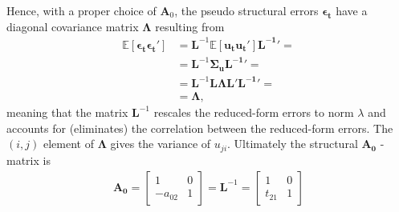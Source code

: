 \documentclass[a4paper,11pt,listof=nochaptergap,oneside,pointednumbers,bibtotoc,bigheadings,liststotoc]{scrbook}
\theoremstyle{mysatz}
\theoremstyle{mydefinition}
\theoremstyle{mytheorem}
\theoremstyle{mybemerkung}
\newcommand{\vect}[1]{\boldsymbol{\mathbf{#1}}}
\begin{document}
Hence, with a proper choice of $\vect{A}_0$, the pseudo structural errors $\vect{\epsilon_t}$ have a diagonal covariance matrix $\vect{\Lambda}$ resulting from 
\begin{equation} \label{eq:svar22}
\begin{split}
	\mathbb{E}[\vect{\epsilon_t}\vect{\epsilon_t}'] & = \vect{L}^{-1} \mathbb{E}[\vect{u_t}\vect{u_t}']\vect{L^{-1}}' = \\
										& = \vect{L}^{-1} \vect{\Sigma_u} \vect{L^{-1}}' = \\
										& = \vect{L}^{-1} \vect{L \Lambda L}' \vect{L^{-1}}' = \\
										& = \vect{\Lambda},
\end{split}								
\end{equation}
meaning that the matrix $\vect{L}^{-1}$ rescales the reduced-form errors to norm $\lambda$ and accounts for (eliminates) the correlation between the reduced-form errors. The $(i, j)$ element of $\vect{\Lambda}$ gives the variance of $u_{ji}$. Ultimately the structural $\vect{A_0}$ - matrix is
\begin{equation} \label{eq:svar23}
\begin{split}
	\vect{A_0} = \begin{bmatrix}
    					1 & 0 \\
					-a_{02} & 1
 					\end{bmatrix} = 
					\vect{L}^{-1} = 
						\begin{bmatrix}
    						1 & 0 \\
						t_{21} & 1
 						\end{bmatrix}
\end{split}								
\end{equation}
\end{document}
